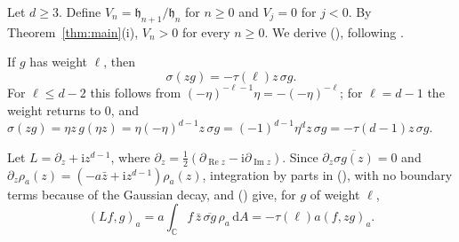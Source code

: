 \documentclass[twoside,10pt]{article}
\numberwithin{equation}{section}
\theoremstyle{slbody}
\theoremstyle{remark}
\newcommand{\C}{\mathbb C}
\newcommand{\dd}{\,\mathrm d}
\newcommand{\ii}{\mathrm i}
\newcommand{\fh}{\mathfrak h}
\renewcommand{\eqref}[1]{%
  \textup{{\normalfont(\oldstylenums{\ref{#1}}}\normalfont)}}
\begin{document}
Let \(d\geq3\).  Define \(V_n=\fh_{n+1}/\fh_n\) for \(n\geq0\) and
\(V_j=0\) for \(j<0\).  By Theorem~\ref{thm:main}(i), \(V_n>0\) for
every \(n\geq0\).  We derive \eqref{eq:FH-recurrence}, following
\cite[Lemma~3.4 and equations~(3.1)--(3.3)]{FelderHoppe2025}.

If \(g\) has weight \(\ell\), then
\begin{equation}
\sigma(zg)=-\tau(\ell)z\,\sigma g.
\label{eq:sigma-multiplication}
\end{equation}
For \(\ell\leq d-2\) this follows from
\((-\eta)^{-\ell-1}\eta=-(-\eta)^{-\ell}\); for \(\ell=d-1\) the weight
returns to \(0\), and
\(\sigma(zg)=\eta z\,g(\eta z)=\eta(-\eta)^{d-1}z\,\sigma g
=(-1)^{d-1}\eta^dz\,\sigma g=-\tau(d-1)z\,\sigma g\).

Let \(L=\partial_z+\ii z^{d-1}\), where
\(\partial_z=\frac12(\partial_{\operatorname{Re}z}
-\ii\partial_{\operatorname{Im}z})\).  Since
\(\partial_z\overline{\sigma g(z)}=0\) and
\(\partial_z\rho_a(z)=(-a\bar z+\ii z^{d-1})\rho_a(z)\), integration by
parts in \eqref{eq:pairing}, with no boundary terms because of the
Gaussian decay, and \eqref{eq:sigma-multiplication} give, for \(g\) of
weight \(\ell\),
\begin{equation}
(Lf,g)_a
=a\int_{\C}f\,\bar z\,\overline{\sigma g}\,\rho_a\dd A
=-\tau(\ell)a(f,zg)_a.
\label{eq:ibp-pairing}
\end{equation}
\end{document}
